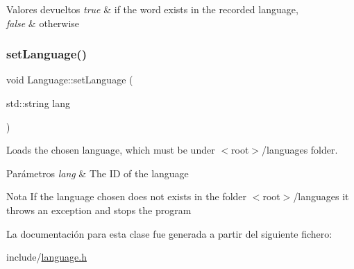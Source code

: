 \begin{DoxyRetVals}{Valores devueltos}
{\em true} & if the word exists in the recorded language, \\
\hline
{\em false} & otherwise \\
\hline
\end{DoxyRetVals}
\mbox{\label{classLanguage_accc1c22d8bba3002a71bea06cecf624b}} 
\subsubsection{\texorpdfstring{set\+Language()}{setLanguage()}}
{\footnotesize\ttfamily void Language\+::set\+Language (\begin{DoxyParamCaption}\item[{std\+::string}]{lang }\end{DoxyParamCaption})}



Loads the chosen language, which must be under $<$root$>$/languages folder. 


\begin{DoxyParams}{Parámetros}
{\em lang} & The ID of the language \\
\hline
\end{DoxyParams}
\begin{DoxyNote}{Nota}
If the language chosen does not exists in the folder $<$root$>$/languages it throws an exception and stops the program 
\end{DoxyNote}


La documentación para esta clase fue generada a partir del siguiente fichero\+:\begin{DoxyCompactItemize}
\item 
include/\hyperlink{language_8h}{language.\+h}\end{DoxyCompactItemize}
